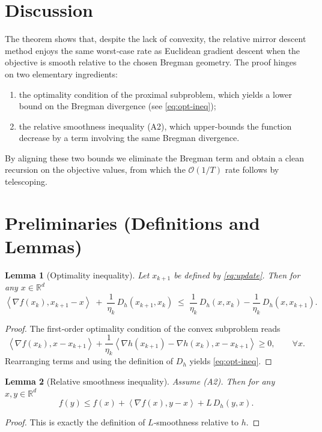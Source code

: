 \documentclass{article}
\newtheorem{lemma}{Lemma}
\newcommand{\grad}{\nabla}
\newcommand{\Dh}{D_h}
\newcommand{\R}{\mathbb{R}}
\newcommand{\inner}[2]{\left\langle #1,#2\right\rangle}
\begin{document}
\section*{Discussion}
The theorem shows that, despite the lack of convexity, the relative mirror descent method enjoys the same worst‑case rate as Euclidean gradient descent when the objective is smooth relative to the chosen Bregman geometry. The proof hinges on two elementary ingredients:
\begin{enumerate}
\item the optimality condition of the proximal subproblem, which yields a lower bound on the Bregman divergence (see \eqref{eq:opt-ineq});
\item the relative smoothness inequality (A2), which upper‑bounds the function decrease by a term involving the same Bregman divergence.
\end{enumerate}
By aligning these two bounds we eliminate the Bregman term and obtain a clean recursion on the objective values, from which the $\mathcal{O}(1/T)$ rate follows by telescoping.

\section*{Preliminaries (Definitions and Lemmas)}
\begin{lemma}[Optimality inequality]
\label{lem:opt}
Let $x_{k+1}$ be defined by \eqref{eq:update}. Then for any $x\in\R^{d}$
\[
\inner{\grad f(x_k)}{x_{k+1}-x}
\;+\;\frac{1}{\eta_k}\,\Dh(x_{k+1},x_k)
\;\le\;
\frac{1}{\eta_k}\,\Dh(x,x_k)-\frac{1}{\eta_k}\,\Dh(x,x_{k+1}). \tag{2}
\]
\end{lemma}
\begin{proof}
The first‑order optimality condition of the convex subproblem reads
\[
\inner{\grad f(x_k)}{x-x_{k+1}}+\frac{1}{\eta_k}\inner{\nabla h(x_{k+1})-\nabla h(x_k)}{x-x_{k+1}}\ge0,
\qquad\forall x.
\]
Rearranging terms and using the definition of $\Dh$ yields \eqref{eq:opt-ineq}. \hfill\qedsymbol
\end{proof}

\begin{lemma}[Relative smoothness inequality]
\label{lem:smooth}
Assume (A2). Then for any $x,y\in\R^{d}$
\[
f(y)\le f(x)+\inner{\grad f(x)}{y-x}+L\,\Dh(y,x). \tag{3}
\]
\end{lemma}
\begin{proof}
This is exactly the definition of $L$‑smoothness relative to $h$. \hfill\qedsymbol
\end{proof}
\end{document}
